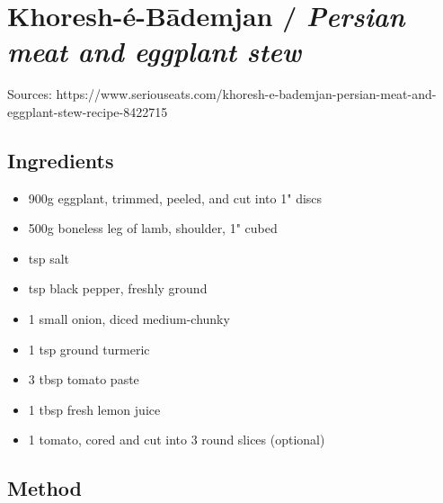 \section{Khoresh-é-Bādemjan / \emph{Persian meat and eggplant stew}}


Sources: https://www.seriouseats.com/khoresh-e-bademjan-persian-meat-and-eggplant-stew-recipe-8422715

\subsection{Ingredients}

\begin{itemize}
    \item 900g eggplant, trimmed, peeled, and cut into 1" discs
    \item 500g boneless leg of lamb, shoulder, 1" cubed
    \item {} tsp salt
    \item {} tsp black pepper, freshly ground
    \item 1 small onion, diced medium-chunky
    \item 1 tsp ground turmeric
    \item 3 tbsp tomato paste
    \item 1 tbsp fresh lemon juice
    \item 1 tomato, cored and cut into 3 round slices (optional)
\end{itemize}

\subsection{Method}

